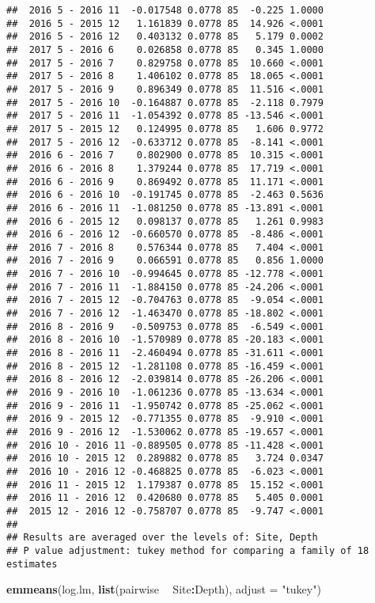 \documentclass[
]{article}
\newenvironment{Shaded}{\begin{snugshade}}{\end{snugshade}}
\newcommand{\DataTypeTok}[1]{\textcolor[rgb]{0.13,0.29,0.53}{#1}}
\newcommand{\KeywordTok}[1]{\textcolor[rgb]{0.13,0.29,0.53}{\textbf{#1}}}
\newcommand{\NormalTok}[1]{#1}
\newcommand{\OperatorTok}[1]{\textcolor[rgb]{0.81,0.36,0.00}{\textbf{#1}}}
\newcommand{\StringTok}[1]{\textcolor[rgb]{0.31,0.60,0.02}{#1}}
\begin{document}
\begin{verbatim}
##  2016 5 - 2016 11  -0.017548 0.0778 85  -0.225 1.0000 
##  2016 5 - 2015 12   1.161839 0.0778 85  14.926 <.0001 
##  2016 5 - 2016 12   0.403132 0.0778 85   5.179 0.0002 
##  2017 5 - 2016 6    0.026858 0.0778 85   0.345 1.0000 
##  2017 5 - 2016 7    0.829758 0.0778 85  10.660 <.0001 
##  2017 5 - 2016 8    1.406102 0.0778 85  18.065 <.0001 
##  2017 5 - 2016 9    0.896349 0.0778 85  11.516 <.0001 
##  2017 5 - 2016 10  -0.164887 0.0778 85  -2.118 0.7979 
##  2017 5 - 2016 11  -1.054392 0.0778 85 -13.546 <.0001 
##  2017 5 - 2015 12   0.124995 0.0778 85   1.606 0.9772 
##  2017 5 - 2016 12  -0.633712 0.0778 85  -8.141 <.0001 
##  2016 6 - 2016 7    0.802900 0.0778 85  10.315 <.0001 
##  2016 6 - 2016 8    1.379244 0.0778 85  17.719 <.0001 
##  2016 6 - 2016 9    0.869492 0.0778 85  11.171 <.0001 
##  2016 6 - 2016 10  -0.191745 0.0778 85  -2.463 0.5636 
##  2016 6 - 2016 11  -1.081250 0.0778 85 -13.891 <.0001 
##  2016 6 - 2015 12   0.098137 0.0778 85   1.261 0.9983 
##  2016 6 - 2016 12  -0.660570 0.0778 85  -8.486 <.0001 
##  2016 7 - 2016 8    0.576344 0.0778 85   7.404 <.0001 
##  2016 7 - 2016 9    0.066591 0.0778 85   0.856 1.0000 
##  2016 7 - 2016 10  -0.994645 0.0778 85 -12.778 <.0001 
##  2016 7 - 2016 11  -1.884150 0.0778 85 -24.206 <.0001 
##  2016 7 - 2015 12  -0.704763 0.0778 85  -9.054 <.0001 
##  2016 7 - 2016 12  -1.463470 0.0778 85 -18.802 <.0001 
##  2016 8 - 2016 9   -0.509753 0.0778 85  -6.549 <.0001 
##  2016 8 - 2016 10  -1.570989 0.0778 85 -20.183 <.0001 
##  2016 8 - 2016 11  -2.460494 0.0778 85 -31.611 <.0001 
##  2016 8 - 2015 12  -1.281108 0.0778 85 -16.459 <.0001 
##  2016 8 - 2016 12  -2.039814 0.0778 85 -26.206 <.0001 
##  2016 9 - 2016 10  -1.061236 0.0778 85 -13.634 <.0001 
##  2016 9 - 2016 11  -1.950742 0.0778 85 -25.062 <.0001 
##  2016 9 - 2015 12  -0.771355 0.0778 85  -9.910 <.0001 
##  2016 9 - 2016 12  -1.530062 0.0778 85 -19.657 <.0001 
##  2016 10 - 2016 11 -0.889505 0.0778 85 -11.428 <.0001 
##  2016 10 - 2015 12  0.289882 0.0778 85   3.724 0.0347 
##  2016 10 - 2016 12 -0.468825 0.0778 85  -6.023 <.0001 
##  2016 11 - 2015 12  1.179387 0.0778 85  15.152 <.0001 
##  2016 11 - 2016 12  0.420680 0.0778 85   5.405 0.0001 
##  2015 12 - 2016 12 -0.758707 0.0778 85  -9.747 <.0001 
## 
## Results are averaged over the levels of: Site, Depth 
## P value adjustment: tukey method for comparing a family of 18 estimates
\end{verbatim}

\begin{Shaded}
\begin{Highlighting}[]
\KeywordTok{emmeans}\NormalTok{(log.lm, }\KeywordTok{list}\NormalTok{(pairwise }\OperatorTok{~}\StringTok{ }\NormalTok{Site}\OperatorTok{:}\NormalTok{Depth), }\DataTypeTok{adjust =} \StringTok{"tukey"}\NormalTok{)}
\end{Highlighting}
\end{Shaded}
\end{document}
